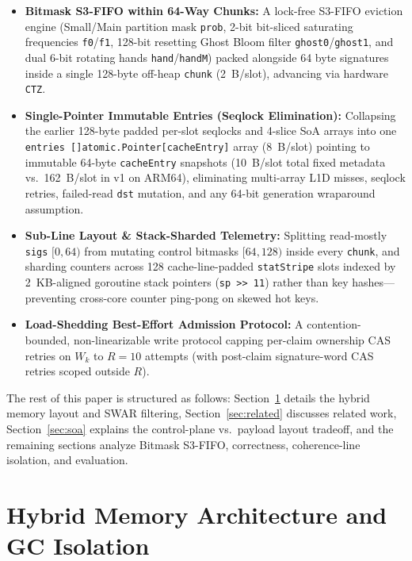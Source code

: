 \documentclass[11pt,a4paper]{article}
\begin{document}
\begin{itemize}
    \item \textbf{Bitmask S3-FIFO within 64-Way Chunks:} A lock-free S3-FIFO eviction engine (Small/Main partition mask \texttt{prob}, 2-bit bit-sliced saturating frequencies \texttt{f0}/\texttt{f1}, 128-bit resetting Ghost Bloom filter \texttt{ghost0}/\texttt{ghost1}, and dual 6-bit rotating hands \texttt{hand}/\texttt{handM}) packed alongside 64 byte signatures inside a single 128-byte off-heap \texttt{chunk} (2~B/slot), advancing via hardware \texttt{CTZ}.
    \item \textbf{Single-Pointer Immutable Entries (Seqlock Elimination):} Collapsing the earlier 128-byte padded per-slot seqlocks and 4-slice SoA arrays into one \texttt{entries []atomic.Pointer[cacheEntry]} array (8~B/slot) pointing to immutable 64-byte \texttt{cacheEntry} snapshots (10~B/slot total fixed metadata vs.\ 162~B/slot in v1 on ARM64), eliminating multi-array L1D misses, seqlock retries, failed-read \texttt{dst} mutation, and any 64-bit generation wraparound assumption.
    \item \textbf{Sub-Line Layout \& Stack-Sharded Telemetry:} Splitting read-mostly \texttt{sigs} $[0,64)$ from mutating control bitmasks $[64,128)$ inside every \texttt{chunk}, and sharding counters across 128 cache-line-padded \texttt{statStripe} slots indexed by 2~KB-aligned goroutine stack pointers (\texttt{sp >> 11}) rather than key hashes---preventing cross-core counter ping-pong on skewed hot keys.
    \item \textbf{Load-Shedding Best-Effort Admission Protocol:} A contention-bounded, non-linearizable write protocol capping per-claim ownership CAS retries on $W_k$ to $R=10$ attempts (with post-claim signature-word CAS retries scoped outside $R$).
\end{itemize}

The rest of this paper is structured as follows: Section~\ref{sec:hybrid} details the hybrid memory layout and SWAR filtering, Section~\ref{sec:related} discusses related work, Section~\ref{sec:soa} explains the control-plane vs.\ payload layout tradeoff, and the remaining sections analyze Bitmask S3-FIFO, correctness, coherence-line isolation, and evaluation.

\section{Hybrid Memory Architecture and GC Isolation}
\label{sec:hybrid}
\end{document}
